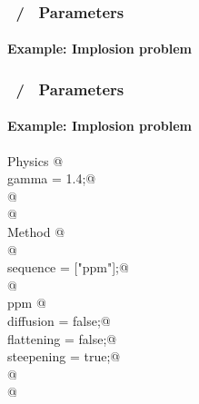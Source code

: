 \begin{frame}[fragile] 
\frametitle{\enzop\ / \cello\ Parameters}
\framesubtitle{Example: Implosion problem}
\end{frame}

\begin{frame}[fragile] 
\frametitle{\enzop\ / \cello\ Parameters}
\framesubtitle{Example: Implosion problem}
\begin{block}{}\footnotesize
{}  \verb@    Physics {@ \\
  \verb@       gamma = 1.4;@ \\
  \verb@    }@ \\
  \verb@ @ \\
  \verb@    Method {@ \\
  \verb@  @ \\
  \verb@       sequence = ["ppm"];@ \\
  \verb@ @ \\
  \verb@       ppm {@ \\
  \verb@          diffusion   = false;@ \\
  \verb@          flattening  = false;@ \\
  \verb@          steepening  = true;@ \\
  \verb@      }@ \\
  \verb@    }@ \\
\end{block}
\end{frame}

